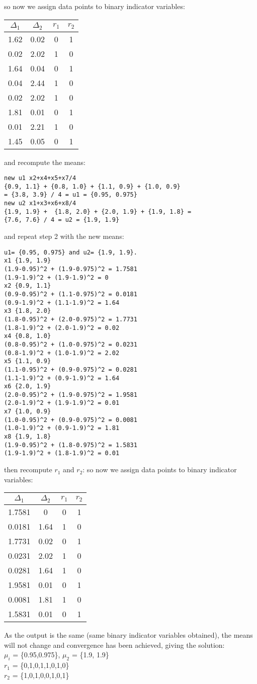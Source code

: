 so now we assign data points to binary indicator variables:
\begin{center}
 \begin{tabular}{||c c c c||} 
 \hline
 $\Delta_1$ & $\Delta_2$ & $r_1$ & $r_2$  \\ [0.5ex] 
 \hline\hline
 1.62 & 0.02 & 0 & 1 \\ 
 \hline
 0.02 & 2.02  & 1 & 0 \\ 
 \hline
1.64 & 0.04 & 0 & 1 \\
 \hline
0.04 & 2.44 & 1 & 0 \\
 \hline
 0.02 & 2.02 & 1 & 0 \\ 
  \hline
1.81 & 0.01 & 0 & 1 \\
 \hline
0.01 & 2.21 & 1 & 0 \\
 \hline
 1.45 & 0.05 & 0 & 1 \\ [1ex] 
 \hline
\end{tabular}
\end{center}
and recompute the means:
\begin{verbatim}
new u1 x2+x4+x5+x7/4 
{0.9, 1.1} + {0.8, 1.0} + {1.1, 0.9} + {1.0, 0.9} 
= {3.8, 3.9} / 4 = u1 = {0.95, 0.975}
new u2 x1+x3+x6+x8/4 
{1.9, 1.9} +  {1.8, 2.0} + {2.0, 1.9} + {1.9, 1.8} = 
{7.6, 7.6} / 4 = u2 = {1.9, 1.9}
\end{verbatim}
and repeat step 2 with the new means:
\begin{verbatim}
u1= {0.95, 0.975} and u2= {1.9, 1.9}.
x1 {1.9, 1.9}
(1.9-0.95)^2 + (1.9-0.975)^2 = 1.7581
(1.9-1.9)^2 + (1.9-1.9)^2 = 0
x2 {0.9, 1.1}
(0.9-0.95)^2 + (1.1-0.975)^2 = 0.0181
(0.9-1.9)^2 + (1.1-1.9)^2 = 1.64
x3 {1.8, 2.0}
(1.8-0.95)^2 + (2.0-0.975)^2 = 1.7731
(1.8-1.9)^2 + (2.0-1.9)^2 = 0.02
x4 {0.8, 1.0}
(0.8-0.95)^2 + (1.0-0.975)^2 = 0.0231
(0.8-1.9)^2 + (1.0-1.9)^2 = 2.02
x5 {1.1, 0.9}
(1.1-0.95)^2 + (0.9-0.975)^2 = 0.0281
(1.1-1.9)^2 + (0.9-1.9)^2 = 1.64
x6 {2.0, 1.9}
(2.0-0.95)^2 + (1.9-0.975)^2 = 1.9581
(2.0-1.9)^2 + (1.9-1.9)^2 = 0.01
x7 {1.0, 0.9}
(1.0-0.95)^2 + (0.9-0.975)^2 = 0.0081
(1.0-1.9)^2 + (0.9-1.9)^2 = 1.81
x8 {1.9, 1.8}
(1.9-0.95)^2 + (1.8-0.975)^2 = 1.5831
(1.9-1.9)^2 + (1.8-1.9)^2 = 0.01
\end{verbatim}
then recompute $r_1$ and $r_2$:
so now we assign data points to binary indicator variables:
\begin{center}
 \begin{tabular}{||c c c c||} 
 \hline
 $\Delta_1$ & $\Delta_2$ & $r_1$ & $r_2$  \\ [0.5ex] 
 \hline\hline
 1.7581 & 0 & 0 & 1 \\ 
 \hline
 0.0181 & 1.64  & 1 & 0 \\ 
 \hline
1.7731 & 0.02 & 0 & 1 \\
 \hline
0.0231 & 2.02 & 1 & 0 \\
 \hline
 0.0281 & 1.64 & 1 & 0 \\ 
  \hline
1.9581 & 0.01 & 0 & 1 \\
 \hline
0.0081 & 1.81 & 1 & 0 \\
 \hline
 1.5831 & 0.01 & 0 & 1 \\ [1ex] 
 \hline
\end{tabular}
\end{center}
As the output is the same (same binary indicator variables obtained), the means will not change and convergence has been achieved, giving the solution: \\
$\mu_i$ = \{0.95,0.975\}, $\mu_2$ = \{1.9, 1.9\} \\
$r_1$ = \{0,1,0,1,1,0,1,0\} \\
$r_2$ = \{1,0,1,0,0,1,0,1\} \\
